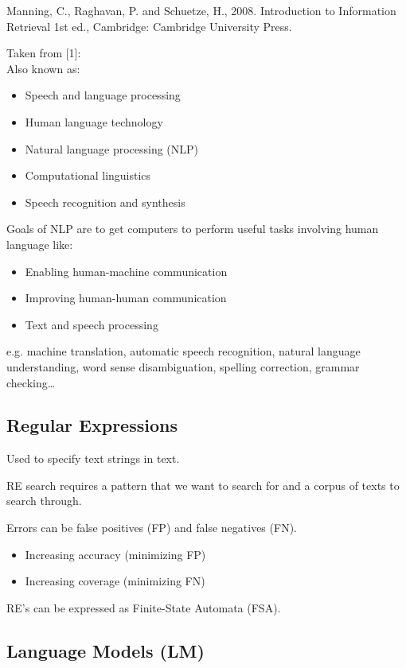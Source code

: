 Manning, C., Raghavan, P. and Schuetze, H., 2008. Introduction to Information Retrieval 1st ed., Cambridge: Cambridge University Press.\citep{Manning2008}

Taken from [1]:\citep{Jurafsky2009}\\
Also known as:\\
\begin{itemize}
\item Speech and language processing
\item Human language technology
\item Natural language processing (NLP)
\item Computational linguistics
\item Speech recognition and synthesis
\end{itemize}

Goals of NLP are to get computers to perform useful tasks involving human language like:
\begin{itemize}
\item Enabling human-machine communication
\item Improving human-human communication
\item Text and speech processing
\end{itemize}

e.g. machine translation, automatic speech recognition, natural language understanding, word sense disambiguation, spelling correction, grammar checking…

\subsection{Regular Expressions}

Used to specify text strings in text.

RE search requires a pattern that we want to search for and a corpus of texts to search through.

Errors can be false positives (FP) and false negatives (FN).

\begin{itemize}
\item Increasing accuracy (minimizing FP)
\item Increasing coverage (minimizing FN)
\end{itemize}

RE's can be expressed as Finite-State Automata (FSA).

\subsection{Language Models (LM)}

